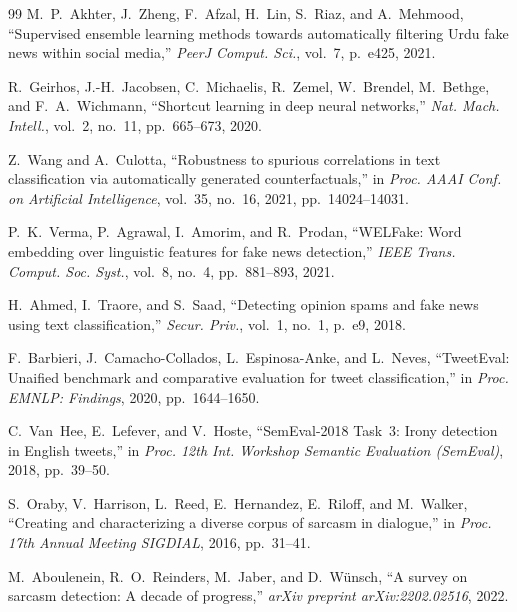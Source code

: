 \documentclass[conference]{IEEEtran}
\begin{document}
\begin{thebibliography}{99}
M.~P.~Akhter, J.~Zheng, F.~Afzal, H.~Lin, S.~Riaz, and A.~Mehmood,
``Supervised ensemble learning methods towards automatically filtering Urdu
fake news within social media,''
\textit{PeerJ Comput. Sci.}, vol.~7, p.~e425, 2021.

R.~Geirhos, J.-H.~Jacobsen, C.~Michaelis, R.~Zemel, W.~Brendel,
M.~Bethge, and F.~A.~Wichmann,
``Shortcut learning in deep neural networks,''
\textit{Nat. Mach. Intell.}, vol.~2, no.~11, pp.~665--673, 2020.

Z.~Wang and A.~Culotta,
``Robustness to spurious correlations in text classification via automatically
generated counterfactuals,''
in \textit{Proc. AAAI Conf. on Artificial Intelligence}, vol.~35, no.~16,
2021, pp.~14024--14031.

P.~K.~Verma, P.~Agrawal, I.~Amorim, and R.~Prodan,
``WELFake: Word embedding over linguistic features for fake news detection,''
\textit{IEEE Trans. Comput. Soc. Syst.}, vol.~8, no.~4, pp.~881--893, 2021.

H.~Ahmed, I.~Traore, and S.~Saad,
``Detecting opinion spams and fake news using text classification,''
\textit{Secur. Priv.}, vol.~1, no.~1, p.~e9, 2018.

F.~Barbieri, J.~Camacho-Collados, L.~Espinosa-Anke, and L.~Neves,
``TweetEval: Unaified benchmark and comparative evaluation for tweet
classification,''
in \textit{Proc. EMNLP: Findings}, 2020, pp.~1644--1650.

C.~Van~Hee, E.~Lefever, and V.~Hoste,
``SemEval-2018 Task~3: Irony detection in English tweets,''
in \textit{Proc. 12th Int. Workshop Semantic Evaluation (SemEval)}, 2018,
pp.~39--50.

S.~Oraby, V.~Harrison, L.~Reed, E.~Hernandez, E.~Riloff, and M.~Walker,
``Creating and characterizing a diverse corpus of sarcasm in dialogue,''
in \textit{Proc. 17th Annual Meeting SIGDIAL}, 2016, pp.~31--41.

M.~Aboulenein, R.~O.~Reinders, M.~Jaber, and D.~W{\"u}nsch,
``A survey on sarcasm detection: A decade of progress,''
\textit{arXiv preprint arXiv:2202.02516}, 2022.

\end{thebibliography}
\end{document}
